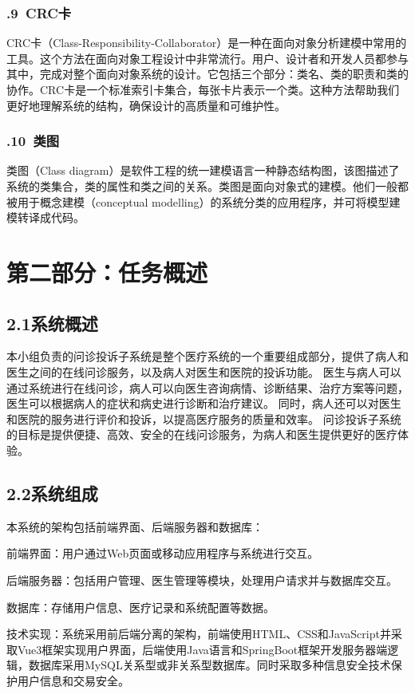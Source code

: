 \documentclass[24pt,a4paper]{article}%
\begin{document}
\subsubsection*{.9\ CRC卡}
CRC卡（Class-Responsibility-Collaborator）是一种在面向对象分析建模中常用的工具。这个方法在面向对象工程设计中非常流行。用户、设计者和开发人员都参与其中，完成对整个面向对象系统的设计。它包括三个部分：类名、类的职责和类的协作。CRC卡是一个标准索引卡集合，每张卡片表示一个类。这种方法帮助我们更好地理解系统的结构，确保设计的高质量和可维护性。
\subsubsection*{.10\ 类图}
类图（Class diagram）是软件工程的统一建模语言一种静态结构图，该图描述了系统的类集合，类的属性和类之间的关系。类图是面向对象式的建模。他们一般都被用于概念建模（conceptual modelling）的系统分类的应用程序，并可将模型建模转译成代码。

\newpage

\section*{\songti 第二部分：任务概述}
\subsection*{\songti 2.1系统概述}
本小组负责的问诊投诉子系统是整个医疗系统的一个重要组成部分，提供了病人和医生之间的在线问诊服务，以及病人对医生和医院的投诉功能。
医生与病人可以通过系统进行在线问诊，病人可以向医生咨询病情、诊断结果、治疗方案等问题，医生可以根据病人的症状和病史进行诊断和治疗建议。
同时，病人还可以对医生和医院的服务进行评价和投诉，以提高医疗服务的质量和效率。
问诊投诉子系统的目标是提供便捷、高效、安全的在线问诊服务，为病人和医生提供更好的医疗体验。
\subsection*{\songti 2.2系统组成}
本系统的架构包括前端界面、后端服务器和数据库：\par \noindent 前端界面：用户通过Web页面或移动应用程序与系统进行交互。\par \noindent 后端服务器：包括用户管理、医生管理等模块，处理用户请求并与数据库交互。\par \noindent 数据库：存储用户信息、医疗记录和系统配置等数据。\par
技术实现：系统采用前后端分离的架构，前端使用HTML、CSS和JavaScript并采取Vue3框架实现用户界面，后端使用Java语言和SpringBoot框架开发服务器端逻辑，数据库采用MySQL关系型或非关系型数据库。同时采取多种信息安全技术保护用户信息和交易安全。
\end{document}
